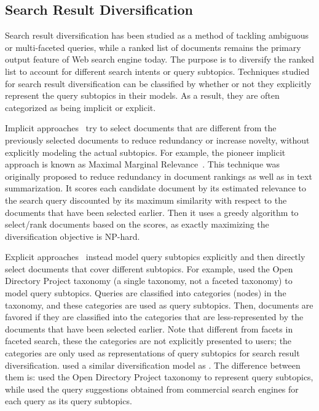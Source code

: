 \subsection{Search Result Diversification}
Search result diversification has been studied as a method of tackling ambiguous or multi-faceted queries, while a ranked list of documents remains the primary output feature of Web search engine today. The purpose is to diversify the ranked list to account for different search intents or query subtopics.
Techniques studied for search result diversification can be classified by whether or not they explicitly represent the query subtopics in their models. As a result, they are often
categorized as being implicit or explicit. 

Implicit approaches~\cite{carbonell1998use,zhai2003beyond} try to select documents that are different from the previously selected documents to reduce redundancy or increase novelty, without explicitly modeling the actual subtopics. For example, the pioneer implicit approach is known as Maximal Marginal Relevance~\cite{carbonell1998use}. This technique was originally proposed to reduce redundancy in document rankings as well as in text summarization. It scores each candidate document by its estimated relevance to the search query discounted by its maximum similarity with respect to the documents that have been selected earlier. Then it uses a greedy algorithm to select/rank documents based on the scores, as exactly maximizing the diversification objective is NP-hard.

Explicit  approaches~\cite{agrawal2009diversifying,carterette2009probabilistic,santos2010exploiting,dang2012diversity,dang2013term} instead model query subtopics explicitly and then directly select documents that cover different subtopics. For example, \citet{agrawal2009diversifying} used the Open Directory Project taxonomy (a single taxonomy, not a faceted taxonomy) to model
query subtopics. Queries are classified into categories (nodes) in the taxonomy, and these categories are used as query subtopics. Then, documents are favored if they are classified into the categories that are less-represented by the documents that have been selected earlier. Note that different from facets in faceted search, these the categories are not explicitly presented to users; the categories are only used as representations of query subtopics for search result diversification. \citet{santos2010exploiting} used a similar diversification model as \citet{agrawal2009diversifying}. The difference between them is: \citet{agrawal2009diversifying} used the Open Directory Project taxonomy to represent query subtopics, while \citet{santos2010exploiting} used the query suggestions obtained from commercial search engines for each query as its query subtopics. 
 
